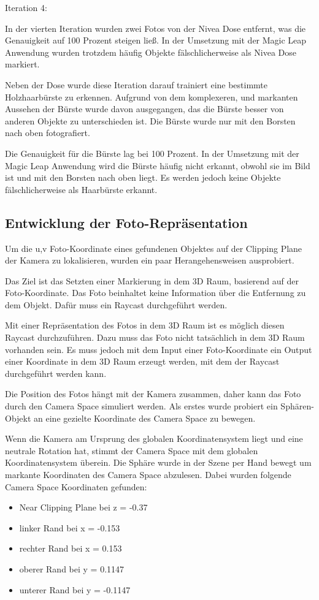 \documentclass[german,a4paper, 12pt]{llncs}
\begin{document}
Iteration 4:

In der vierten Iteration wurden zwei Fotos von der Nivea Dose entfernt, was die Genauigkeit auf 100 Prozent steigen ließ. In der Umsetzung mit der Magic Leap Anwendung wurden trotzdem häufig Objekte fälschlicherweise als Nivea Dose markiert.

Neben der Dose wurde diese Iteration darauf trainiert eine bestimmte Holzhaarbürste zu erkennen. Aufgrund von dem komplexeren, und markanten Aussehen der Bürste wurde davon ausgegangen, das die Bürste besser von anderen Objekte zu unterschieden ist. 
Die Bürste wurde nur mit den Borsten nach oben fotografiert.

Die Genauigkeit für die Bürste lag bei 100 Prozent. 
In der Umsetzung mit der Magic Leap Anwendung wird die Bürste häufig nicht erkannt, obwohl sie im Bild ist und mit den Borsten nach oben liegt. Es werden jedoch keine Objekte fälschlicherweise als Haarbürste erkannt.

\subsection{Entwicklung der Foto-Repräsentation}
\label{section:devpixeltoworld}

Um die u,v Foto-Koordinate eines gefundenen Objektes auf der Clipping Plane der Kamera zu lokalisieren, wurden ein paar Herangehensweisen ausprobiert.

Das Ziel ist das Setzten einer Markierung in dem 3D Raum, basierend auf der Foto-Koordinate. Das Foto beinhaltet keine Information über die Entfernung zu dem Objekt. Dafür muss ein Raycast durchgeführt werden. 

Mit einer Repräsentation des Fotos in dem 3D Raum ist es möglich diesen Raycast durchzuführen. 
Dazu muss das Foto nicht tatsächlich in dem 3D Raum vorhanden sein. Es muss jedoch mit dem Input einer Foto-Koordinate ein Output einer Koordinate in dem 3D Raum erzeugt werden, mit dem der Raycast durchgeführt werden kann.

Die Position des Fotos hängt mit der Kamera zusammen, daher kann das Foto durch den Camera Space simuliert werden. Als erstes wurde probiert ein Sphären-Objekt an eine gezielte Koordinate des Camera Space zu bewegen. 

Wenn die Kamera am Ursprung des globalen Koordinatensystem liegt und eine neutrale Rotation hat, stimmt der Camera Space mit dem globalen Koordinatensystem überein. Die Sphäre wurde in der Szene per Hand bewegt um markante Koordinaten des Camera Space abzulesen. Dabei wurden folgende Camera Space Koordinaten gefunden:
\begin{itemize}
	\item Near Clipping Plane bei z = -0.37
	\item linker Rand bei x = -0.153
	\item rechter Rand bei x = 0.153
	\item oberer Rand bei y = 0.1147
	\item unterer Rand bei y = -0.1147
\end{itemize}
\end{document}
